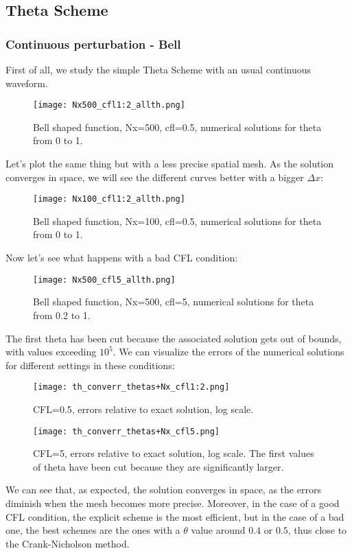 \documentclass[12pt]{article}
\begin{document}
\subsection*{Theta Scheme}

\subsubsection*{Continuous perturbation - Bell}

First of all, we study the simple Theta Scheme with an usual continuous waveform.
\begin{figure}[H]
    \centering
    \texttt{[image: Nx500\_cfl1:2\_allth.png]}
    \caption{Bell shaped function, Nx=500, cfl=0.5, numerical solutions for theta from 0 to 1.}
\end{figure}

Let's plot the same thing but with a less precise spatial mesh. As the solution converges in space, we will see the different curves better with a bigger $\Delta x$:
\begin{figure}[H]
    \centering
    \texttt{[image: Nx100\_cfl1:2\_allth.png]}
    \caption{Bell shaped function, Nx=100, cfl=0.5, numerical solutions for theta from 0 to 1.}
\end{figure}

Now let's see what happens with a bad CFL condition:
\begin{figure}[H]
    \centering
    \texttt{[image: Nx500\_cfl5\_allth.png]}
    \caption{Bell shaped function, Nx=500, cfl=5, numerical solutions for theta from 0.2 to 1.}
\end{figure}
The first theta has been cut because the associated solution gets out of bounds, with values exceeding $10^5$.
We can visualize the errors of the numerical solutions for different settings in these conditions:

\begin{figure}[H]
    \centering
    \texttt{[image: th\_converr\_thetas+Nx\_cfl1:2.png]}
    \caption{CFL=0.5, errors relative to exact solution, log scale.}
\end{figure}

\begin{figure}[H]
    \centering
    \texttt{[image: th\_converr\_thetas+Nx\_cfl5.png]}
    \caption{CFL=5, errors relative to exact solution, log scale. The first values of theta have been cut because they are significantly larger.}
\end{figure}
We can see that, as expected, the solution converges in space, as the errors diminish when the mesh becomes more precise.
Moreover, in the case of a good CFL condition, the explicit scheme is the most efficient, but in the case of a bad one, the best schemes are the ones with a $\theta$ value around $0.4$ or $0.5$, thus close to the Crank-Nicholson method.
\end{document}

